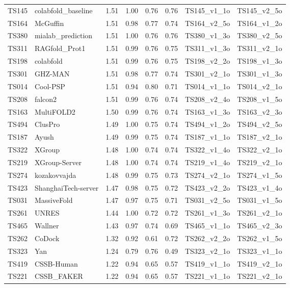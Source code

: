 \begin{table}[ht]
{\begin{tabular}{llllllll}
TS145 & colabfold\_baseline & 1.51 & 1.00 & 0.76 & 0.76 & TS145\_v1\_1o & TS145\_v2\_5o \\ 
TS164 & McGuffin & 1.51 & 0.98 & 0.77 & 0.74 & TS164\_v2\_5o & TS164\_v1\_2o \\ 
TS380 & mialab\_prediction & 1.51 & 1.00 & 0.76 & 0.76 & TS380\_v1\_3o & TS380\_v2\_5o \\ 
TS311 & RAGfold\_Prot1 & 1.51 & 0.99 & 0.76 & 0.75 & TS311\_v1\_3o & TS311\_v2\_1o \\ 
TS198 & colabfold & 1.51 & 0.99 & 0.76 & 0.75 & TS198\_v2\_2o & TS198\_v1\_3o \\ 
TS301 & GHZ-MAN & 1.51 & 0.98 & 0.77 & 0.74 & TS301\_v2\_1o & TS301\_v1\_3o \\ 
TS014 & Cool-PSP & 1.51 & 0.94 & 0.80 & 0.71 & TS014\_v1\_1o & TS014\_v2\_1o \\ 
TS208 & falcon2 & 1.51 & 0.99 & 0.76 & 0.74 & TS208\_v2\_4o & TS208\_v1\_5o \\ 
TS163 & MultiFOLD2 & 1.50 & 0.99 & 0.76 & 0.74 & TS163\_v1\_3o & TS163\_v2\_3o \\ 
TS494 & ClusPro & 1.49 & 1.00 & 0.75 & 0.74 & TS494\_v1\_2o & TS494\_v2\_5o \\ 
TS187 & Ayush & 1.49 & 0.99 & 0.75 & 0.74 & TS187\_v1\_1o & TS187\_v2\_1o \\ 
TS322 & XGroup & 1.48 & 1.00 & 0.74 & 0.74 & TS322\_v1\_4o & TS322\_v2\_1o \\ 
TS219 & XGroup-Server & 1.48 & 1.00 & 0.74 & 0.74 & TS219\_v1\_4o & TS219\_v2\_1o \\ 
TS274 & kozakovvajda & 1.48 & 0.99 & 0.75 & 0.73 & TS274\_v2\_1o & TS274\_v1\_5o \\ 
TS423 & ShanghaiTech-server & 1.47 & 0.98 & 0.75 & 0.72 & TS423\_v2\_2o & TS423\_v1\_4o \\ 
TS031 & MassiveFold & 1.47 & 0.97 & 0.75 & 0.71 & TS031\_v2\_5o & TS031\_v1\_5o \\ 
TS261 & UNRES & 1.44 & 1.00 & 0.72 & 0.72 & TS261\_v1\_3o & TS261\_v2\_1o \\ 
TS465 & Wallner & 1.43 & 0.97 & 0.74 & 0.69 & TS465\_v1\_1o & TS465\_v2\_3o \\ 
TS262 & CoDock & 1.32 & 0.92 & 0.61 & 0.72 & TS262\_v2\_2o & TS262\_v1\_5o \\ 
TS323 & Yan & 1.24 & 0.79 & 0.76 & 0.49 & TS323\_v2\_1o & TS323\_v1\_1o \\ 
TS419 & CSSB-Human & 1.22 & 0.94 & 0.65 & 0.57 & TS419\_v1\_1o & TS419\_v2\_1o \\ 
TS221 & CSSB\_FAKER & 1.22 & 0.94 & 0.65 & 0.57 & TS221\_v1\_1o & TS221\_v2\_1o \\ 

\end{tabular}}
\end{table}
